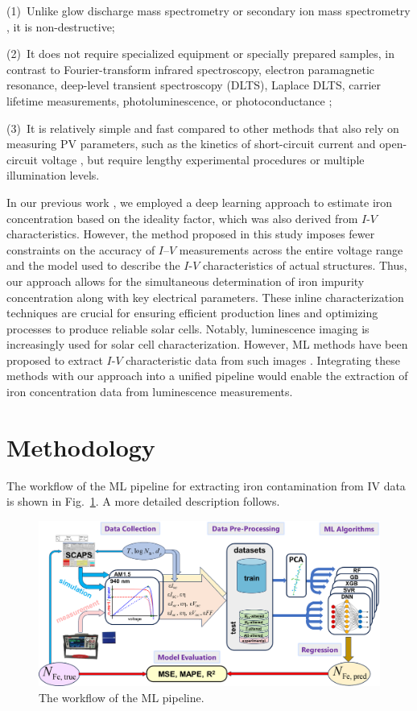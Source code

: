 \documentclass[a4paper,fleqn]{cas-sc}
\begin{document}
\noindent
(1)~Unlike glow discharge mass spectrometry or secondary ion mass spectrometry \cite{DiSabatino2014}, it is non-destructive;

\noindent
(2)~It does not require specialized equipment or specially prepared samples, in contrast
to Fourier-transform infrared spectroscopy, electron paramagnetic resonance, deep-level transient spectroscopy (DLTS),
Laplace DLTS, carrier lifetime measurements, photoluminescence, or photoconductance
\cite{Schroder2006, HowMuchPhysics, LaplDLTS, Rein2, Schmidt2005, FeMethod2012, Goodarzi2017};

\noindent
(3)~It is relatively simple and fast compared to other methods that also rely on measuring PV parameters,
such as the kinetics of short-circuit current \cite{Olikh2021JAP} and open-circuit voltage \cite{Herguth2022},
but require lengthy experimental procedures or multiple illumination levels.

In our previous work \cite{Olikh2022PPV},
we employed a deep learning approach to estimate iron concentration based on the ideality factor,
which was also derived from $I$-$V$ characteristics.
However, the method proposed in this study imposes fewer constraints on the accuracy of $I$–$V$ measurements across the entire voltage range
and the model used to describe the $I$-$V$ characteristics of actual structures.
Thus, our approach allows for the simultaneous determination of iron impurity concentration along with key electrical parameters.
These inline characterization techniques are crucial for ensuring efficient production lines and optimizing processes to produce reliable solar cells.
Notably, luminescence imaging is increasingly used for solar cell characterization.
However, ML methods have been proposed to extract $I$-$V$ characteristic data from such images \cite{Kunze2023, Battaglia2023}.
Integrating these methods with our approach into a unified pipeline would enable the extraction of iron concentration data from luminescence measurements.

\section{Methodology}
The workflow of the ML pipeline for extracting iron contamination from IV data is shown in Fig.~\ref{fig1}.
 A more detailed description follows.

\begin{figure}
	\centering
		\includegraphics[width=0.9\linewidth]{Fig1.png}
	  \caption{The workflow of the ML pipeline.}\label{fig1}
\end{figure}
\end{document}
